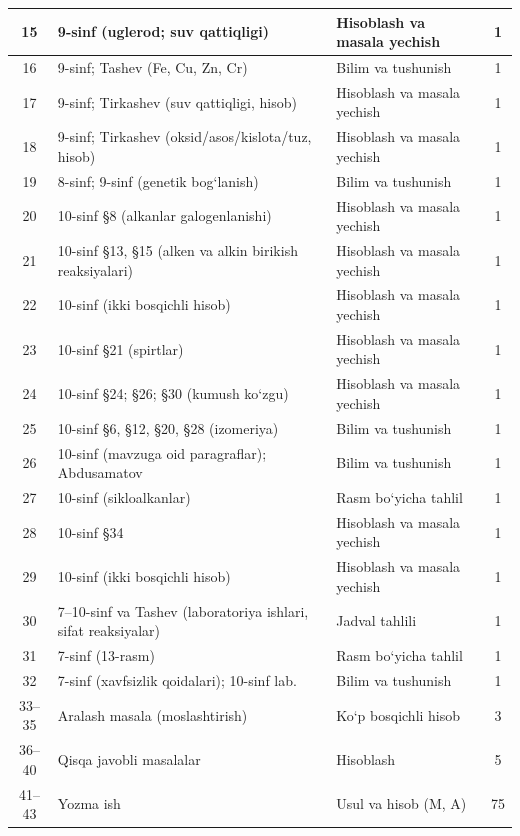 \documentclass[11pt,a4paper]{article}
\begin{document}
{\begin{longtable}{|c|p{7.2cm}|p{5.4cm}|c|}
15 & 9-sinf (uglerod; suv qattiqligi) & Hisoblash va masala yechish & 1\\\hline
16 & 9-sinf; Tashev (Fe, Cu, Zn, Cr) & Bilim va tushunish & 1\\\hline
17 & 9-sinf; Tirkashev (suv qattiqligi, hisob) & Hisoblash va masala yechish & 1\\\hline
18 & 9-sinf; Tirkashev (oksid/asos/kislota/tuz, hisob) & Hisoblash va masala yechish & 1\\\hline
19 & 8-sinf; 9-sinf (genetik bog`lanish) & Bilim va tushunish & 1\\\hline
20 & 10-sinf \S{}8 (alkanlar galogenlanishi) & Hisoblash va masala yechish & 1\\\hline
21 & 10-sinf \S{}13, \S{}15 (alken va alkin birikish reaksiyalari) & Hisoblash va masala yechish & 1\\\hline
22 & 10-sinf (ikki bosqichli hisob) & Hisoblash va masala yechish & 1\\\hline
23 & 10-sinf \S{}21 (spirtlar) & Hisoblash va masala yechish & 1\\\hline
24 & 10-sinf \S{}24; \S{}26; \S{}30 (kumush ko`zgu) & Hisoblash va masala yechish & 1\\\hline
25 & 10-sinf \S{}6, \S{}12, \S{}20, \S{}28 (izomeriya) & Bilim va tushunish & 1\\\hline
26 & 10-sinf (mavzuga oid paragraflar); Abdusamatov & Bilim va tushunish & 1\\\hline
27 & 10-sinf (sikloalkanlar) & Rasm bo`yicha tahlil & 1\\\hline
28 & 10-sinf \S{}34 & Hisoblash va masala yechish & 1\\\hline
29 & 10-sinf (ikki bosqichli hisob) & Hisoblash va masala yechish & 1\\\hline
30 & 7--10-sinf va Tashev (laboratoriya ishlari, sifat reaksiyalar) & Jadval tahlili & 1\\\hline
31 & 7-sinf (13-rasm) & Rasm bo`yicha tahlil & 1\\\hline
32 & 7-sinf (xavfsizlik qoidalari); 10-sinf lab. & Bilim va tushunish & 1\\\hline
33--35 & Aralash masala (moslashtirish) & Ko`p bosqichli hisob & 3\\\hline
36--40 & Qisqa javobli masalalar & Hisoblash & 5\\\hline
41--43 & Yozma ish & Usul va hisob (M, A) & 75\\\hline
\end{longtable}}
\end{document}
